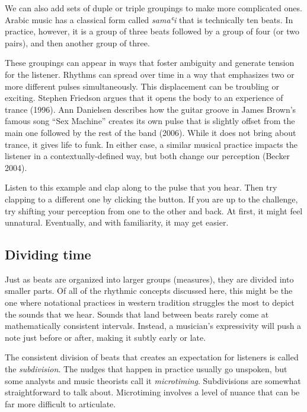 \documentclass[twoside]{article}
\begin{document}
We can also add sets of duple or triple groupings to make more
complicated ones. Arabic music has a classical form called \emph{samaʿi}
that is technically ten beats. In practice, however, it is a group of
three beats followed by a group of four (or two pairs), and then another
group of three.

\hypertarget{example13}{}

These groupings can appear in ways that foster ambiguity and generate
tension for the listener. Rhythms can spread over time in a way that
emphasizes two or more different pulses simultaneously. This
displacement can be troubling or exciting. Stephen Friedson argues that
it opens the body to an experience of trance (1996). Ann Danielsen
describes how the guitar groove in James Brown's famous song ``Sex
Machine'' creates its own pulse that is slightly offset from the main
one followed by the rest of the band (2006). While it does not bring
about trance, it gives life to funk. In either case, a similar musical
practice impacts the listener in a contextually-defined way, but both
change our perception (Becker 2004).

Listen to this example and clap along to the pulse that you hear. Then
try clapping to a different one by clicking the button. If you are up to
the challenge, try shifting your perception from one to the other and
back. At first, it might feel unnatural. Eventually, and with
familiarity, it may get easier.

\hypertarget{example14}{}

\hypertarget{dividing-time}{%
\subsection{Dividing time}\label{dividing-time}}

Just as beats are organized into larger groups (measures), they are
divided into smaller parts. Of all of the rhythmic concepts discussed
here, this might be the one where notational practices in western
tradition struggles the most to depict the sounds that we hear. Sounds
that land between beats rarely come at mathematically consistent
intervals. Instead, a musician's expressivity will push a note just
before or after, making it subtly early or late.

The consistent division of beats that creates an expectation for
listeners is called the \emph{subdivision}. The nudges that happen in
practice usually go unspoken, but some analysts and music theorists call
it \emph{microtiming}. Subdivisions are somewhat straightforward to talk
about. Microtiming involves a level of nuance that can be far more
difficult to articulate.
\end{document}
